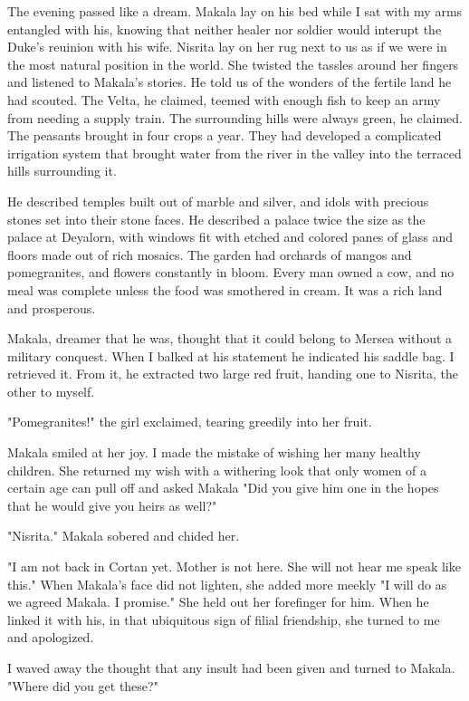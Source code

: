 \documentclass{article}
\begin{document}
The evening passed like a dream. Makala lay on his bed while I sat with my arms entangled with his, knowing that neither healer nor soldier would interupt the Duke's reuinion with his wife. Nisrita lay on her rug next to us as if we were in the most natural position in the world. She twisted the tassles around her fingers and listened to Makala's stories. He told us of the wonders of the fertile land he had scouted. The Velta, he claimed, teemed with enough fish to keep an army from needing a supply train. The surrounding hills were always green, he claimed. The peasants brought in four crops a year. They had developed a complicated irrigation system that brought water from the river in the valley into the terraced hills surrounding it. 

He described temples built out of marble and silver, and idols with precious stones set into their stone faces. He described a palace twice the size as the palace at Deyalorn, with windows fit with etched and colored panes of glass and floors made out of rich mosaics. The garden had orchards of mangos and pomegranites, and flowers constantly in bloom. Every man owned a cow, and no meal was complete unless the food was smothered in cream. It was a rich land and prosperous. 

Makala, dreamer that he was, thought that it could belong to Mersea without a military conquest. When I balked at his statement he indicated his saddle bag. I retrieved it. From it, he extracted two large red fruit, handing one to Nisrita, the other to myself. 

"Pomegranites!" the girl exclaimed, tearing greedily into her fruit.

Makala smiled at her joy. I made the mistake of wishing her many healthy children. She returned my wish with a withering look that only women of a certain age can pull off and asked Makala "Did you give him one in the hopes that he would give you heirs as well?"

"Nisrita." Makala sobered and chided her.

"I am not back in Cortan yet. Mother is not here. She will not hear me speak like this." When Makala's face did not lighten, she added more meekly "I will do as we agreed Makala. I promise." She held out her forefinger for him. When he linked it with his, in that ubiquitous sign of filial friendship, she turned to me and apologized.

I waved away the thought that any insult had been given and turned to Makala. "Where did you get these?"
\end{document}
